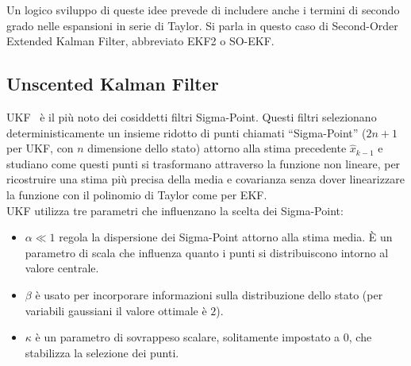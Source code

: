 \documentclass[12pt,a4paper,openright,twoside]{book}
\begin{document}
Un logico sviluppo di queste idee prevede di includere anche i termini di secondo grado nelle espansioni in serie di Taylor. Si parla in questo caso di Second-Order Extended Kalman Filter, abbreviato EKF2 o SO-EKF.

\subsection{Unscented Kalman Filter}

UKF~\cite{882463} è il più noto dei cosiddetti filtri Sigma-Point. Questi filtri selezionano deterministicamente un insieme ridotto di punti chiamati ``Sigma-Point'' ($2n+1$ per UKF, con $n$ dimensione dello stato) attorno alla stima precedente $\hat{x}_{k-1}$ e studiano come questi punti si trasformano attraverso la funzione non lineare, per ricostruire una stima più precisa della media e covarianza senza dover linearizzare la funzione con il polinomio di Taylor come per EKF. \\

UKF utilizza tre parametri che influenzano la scelta dei Sigma-Point:
\begin{itemize}
\item $\alpha\ll1$ regola la dispersione dei Sigma-Point attorno alla stima media. È un parametro di scala che influenza quanto i punti si distribuiscono intorno al valore centrale.
\item $\beta$ è usato per incorporare informazioni sulla distribuzione dello stato (per variabili gaussiani il valore ottimale è $2$).
\item $\kappa$ è un parametro di sovrappeso scalare, solitamente impostato a $0$, che stabilizza la selezione dei punti.
\end{itemize}
\end{document}
